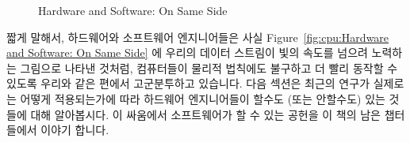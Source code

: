 \begin{figure}[tb]
\centering
{}
\caption{Hardware and Software: On Same Side}
\end{figure}

짧게 말해서, 하드웨어와 소프트웨어 엔지니어들은 사실
Figure~\ref{fig:cpu:Hardware and Software: On Same Side} 에 우리의 데이터
스트림이 빛의 속도를 넘으려 노력하는 그림으로 나타낸 것처럼, 컴퓨터들이 물리적
법칙에도 불구하고 더 빨리 동작할 수 있도록 우리와 같은 편에서 고군분투하고
있습니다.
다음 섹션은 최근의 연구가 실제로는 어떻게 적용되는가에 따라 하드웨어
엔지니어들이 할수도 (또는 안할수도) 있는 것들에 대해 알아봅시다.
이 싸움에서 소프트웨어가 할 수 있는 공헌을 이 책의 남은 챕터들에서 이야기
합니다.

